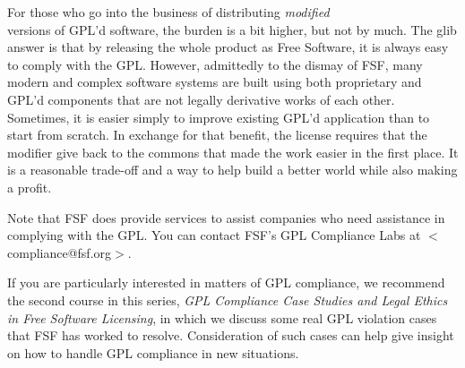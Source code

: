 For those who go into the business of distributing {\em modified\\}
versions of GPL'd software, the burden is a bit higher, but not by
much. The glib answer is that by releasing the whole product as Free
Software, it is always easy to comply with the GPL. However,
admittedly to the dismay of FSF, many modern and complex software
systems are built using both proprietary and GPL'd components that are
not legally derivative works of each other. Sometimes, it is easier simply to
improve existing GPL'd application than to start from scratch. In
exchange for that benefit, the license requires that the modifier give
back to the commons that made the work easier in the first place. It is a
reasonable trade-off and a way to help build a better world while also
making a profit.

Note that FSF does provide services to assist companies who need
assistance in complying with the GPL. You can contact FSF's GPL
Compliance Labs at $<$compliance@fsf.org$>$.

If you are particularly interested in matters of GPL compliance, we
recommend the second course in this series, {\em GPL Compliance Case
  Studies and Legal Ethics in Free Software Licensing\/}, in which we
discuss some real GPL violation cases that FSF has worked to resolve.
Consideration of such cases can help give insight on how to handle GPL
compliance in new situations.


